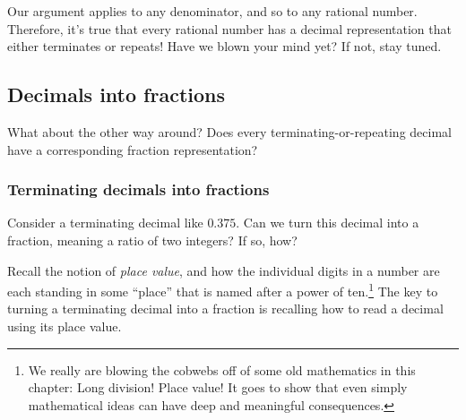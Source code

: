 Our argument applies to any denominator, and so to any rational number. Therefore, it's true that every rational number has a decimal representation that either terminates or repeats! Have we blown your mind yet? If not, stay tuned.

\subsection{Decimals into fractions}

What about the other way around? Does every terminating-or-repeating decimal have a corresponding fraction representation?

\subsubsection{Terminating decimals into fractions}

Consider a terminating decimal like $0.375$. Can we turn this decimal into a fraction, meaning a ratio of two integers? If so, how?

Recall the notion of \textit{place value}, and how the individual digits in a number are each standing in some ``place'' that is named after a power of ten.\footnote{We really are blowing the cobwebs off of some old mathematics in this chapter: Long division! Place value! It goes to show that even simply mathematical ideas can have deep and meaningful consequences.} The key to turning a terminating decimal into a fraction is recalling how to read a decimal using its place value.

\begin{center}
\end{center}


